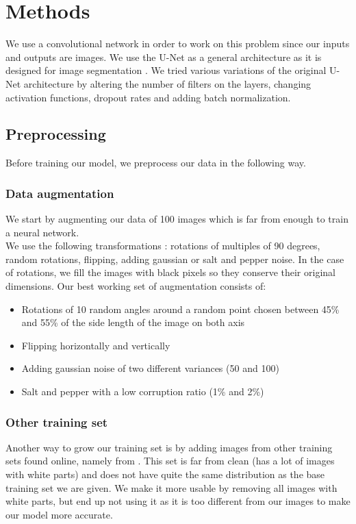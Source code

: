 \documentclass[10pt,conference,compsocconf]{IEEEtran}
\begin{document}
\section{Methods}
We use a convolutional network in order to work on this problem since our inputs and outputs are images. We use the U-Net as a general architecture as it is designed for image segmentation \cite{wiki:u-net}. We tried various variations of the original U-Net architecture by altering the number of filters on the layers, changing activation functions, dropout rates and adding batch normalization.
\subsection{Preprocessing}
\label{preprocess}
Before training our model, we preprocess our data in the following way.
\subsubsection{Data augmentation}
We start by augmenting our data of 100 images which is far from enough to train a neural network.\\
We use the following transformations : rotations of multiples of 90 degrees, random rotations, flipping, adding gaussian or salt and pepper noise. In the case of rotations, we fill the images with black pixels so they conserve their original dimensions. Our best working set of augmentation consists of:
\begin{itemize}
\item Rotations of 10 random angles around a random point chosen between 45\% and 55\% of the side length of the image on both axis
\item Flipping horizontally and vertically
\item Adding gaussian noise of two different variances (50 and 100)
\item Salt and pepper with a low corruption ratio (1\% and 2\%)
\end{itemize}
\subsubsection{Other training set}
\label{otherset}
Another way to grow our training set is by adding images from other training sets found online, namely from \cite{newtraining}. This set is far from clean (has a lot of images with white parts) and does not have quite the same distribution as the base training set we are given. We make it more usable by removing all images with white parts, but end up not using it as it is too different from our images to make our model more accurate.
\end{document}
